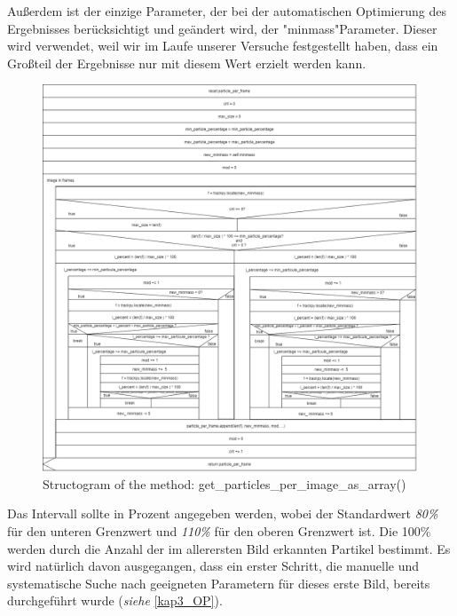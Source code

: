 Außerdem ist der einzige Parameter, der bei der automatischen Optimierung des Ergebnisses berücksichtigt und geändert wird, der "minmass"\-Parameter. Dieser wird verwendet, weil wir im Laufe unserer Versuche festgestellt haben, dass ein Großteil der Ergebnisse nur mit diesem Wert erzielt werden kann.


\begin{figure}[H]
  \centering
  \includegraphics[width=1\textwidth]{Grafiken/pts/structogram.png}
  \caption{Structogram of the method: get\_particles\_per\_image\_as\_array()}
\end{figure}

Das Intervall sollte in Prozent angegeben werden, wobei der Standardwert \textit{80\%} für den unteren Grenzwert und \textit{110\%} für den oberen Grenzwert ist. Die 100\% werden durch die Anzahl der im allerersten Bild erkannten Partikel bestimmt. 
Es wird natürlich davon ausgegangen, dass ein erster Schritt, die manuelle und systematische Suche nach geeigneten Parametern für dieses erste Bild, bereits durchgeführt wurde (\textit{siehe} \ref{kap3_OP}).\\

